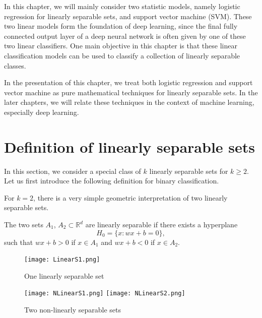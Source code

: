 In this chapter, we will mainly consider two statistic models, namely
logistic regression for linearly separable sets,
and support vector machine (SVM).
These two linear models form the foundation of deep learning, since
the final fully connected output layer of a deep neural network is
often given by one of these two linear classifiers.  One main objective in this chapter is that  these linear classification models can be used to classify a collection of 
linearly separable classes.  

In the presentation of this chapter, we treat both logistic regression
and support vector machine as pure mathematical techniques for
linearly separable sets.  In the later chapters, we will relate these
techniques in the context of machine learning, especially deep
learning. 
\section{Definition of linearly separable sets}
In this section, we consider a special class of $k$ linearly separable sets for $k\ge 2$.  Let us first introduce the following
definition for binary classification. 


For $k=2$, there is a very simple geometric interpretation of two
linearly separable sets. 
\begin{definition}\label{lem:2class}
  The two sets $A_1$, $A_2\subset \mathbb{R}^d$ are linearly separable
   if there exists a hyperplane
  \begin{equation}
    \label{2classH}
H_0=\{x:wx+b=0\},    
  \end{equation}
 such that $wx+b>0$ if $x\in A_1$ and $wx+b<0$ if $x\in A_2$.
  \end{definition}
\begin{figure}
\centering
\texttt{[image: LinearS1.png]}  \quad  %
\caption{One linearly separable set}
\label{twoclassification}
\end{figure}

\begin{figure}
\centering
\texttt{[image: NLinearS1.png]}  \quad  \texttt{[image: NLinearS2.png]} 
\caption{Two non-linearly separable sets}
\label{twoclassification}
\end{figure}

